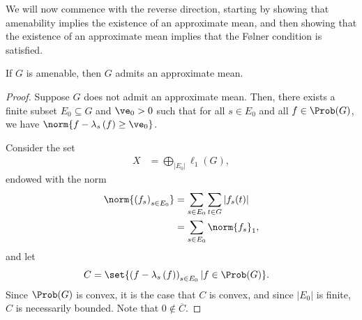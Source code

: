 We will now commence with the reverse direction, starting by showing that amenability implies the existence of an approximate mean, and then showing that the existence of an approximate mean implies that the Følner condition is satisfied.
\begin{proposition}
  If $G$ is amenable, then $G$ admits an approximate mean.
\end{proposition}
\begin{proof}
  Suppose $G$ does not admit an approximate mean. Then, there exists a finite subset $E_0\subseteq G$ and $\ve_0 > 0$ such that for all $s\in E_0$ and all $f\in \Prob(G)$, we have $\norm{f - \lambda_s\left(f\right) \geq \ve_0}$.\newline

  Consider the set
  \begin{align*}
    X &= \bigoplus_{\left\vert E_0 \right\vert} \ell_1\left(G\right),
  \end{align*}
  endowed with the norm
  \begin{align*}
    \norm{\left(f_s\right)_{s\in E_0}} &= \sum_{s\in E_0}\sum_{t\in G}\left\vert f_s(t) \right\vert\\
                                       &= \sum_{s\in E_0}\norm{f_s}_{1},
  \end{align*}
  and let
  \begin{align*}
    C &= \set{\left(f - \lambda_s\left(f\right)\right)_{s\in E_0} | f\in \Prob(G)}.
  \end{align*}
  Since $\Prob(G)$ is convex, it is the case that $C$ is convex, and since $\left\vert E_0 \right\vert$ is finite, $C$ is necessarily bounded. Note that $0\notin \overline{C}$.\newline


\end{proof}
